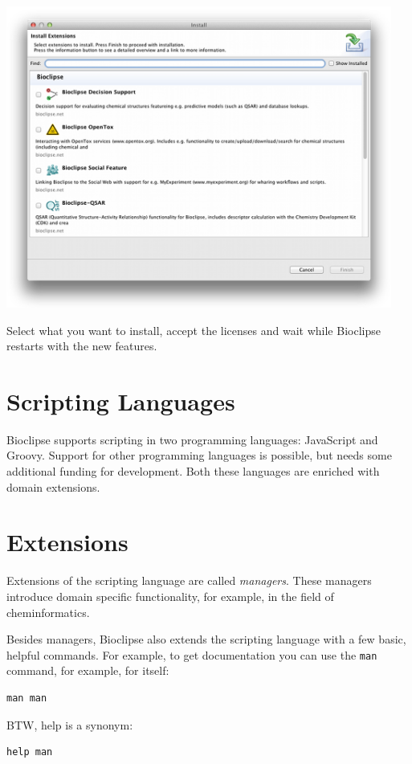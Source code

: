 \documentclass[a5paper, 10pt]{memoir}
\begin{document}
\begin{refsection}
\begin{center}
\includegraphics[width=0.95\textwidth]{images/installFeatures.png}
\end{center}
Select what you want to install, accept the licenses and wait while Bioclipse
restarts with the new features.


\section{Scripting Languages}

Bioclipse supports scripting in two programming languages:
JavaScript and Groovy. Support for other
programming languages is possible, but needs some additional funding for
development. Both these languages are enriched with domain extensions.

\section{Extensions}

Extensions of the scripting language are called \emph{managers}.
These managers introduce domain specific functionality, for
example, in the field of cheminformatics.

Besides managers, Bioclipse also extends the scripting language with a few
basic, helpful commands. For example, to get documentation you can use the
\texttt{man} command, for example, for itself:
\begin{Verbatim}
man man
\end{Verbatim}
BTW, help is a synonym:
\begin{Verbatim}
help man
\end{Verbatim}


\end{refsection}
\end{document}

